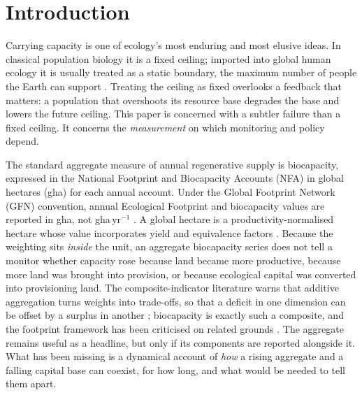 \documentclass[preprint,12pt,authoryear]{elsarticle}
\begin{document}
\section{Introduction}\label{sec:intro}

Carrying capacity is one of ecology's most enduring and most elusive ideas. In classical population biology it is a fixed ceiling; imported into global human ecology it is usually treated as a static boundary, the maximum number of people the Earth can support \citep[cf.][]{Cohen1995}. Treating the ceiling as fixed overlooks a feedback that matters: a population that overshoots its resource base degrades the base and lowers the future ceiling. This paper is concerned with a subtler failure than a fixed ceiling. It concerns the \emph{measurement} on which monitoring and policy depend.

The standard aggregate measure of annual regenerative supply is biocapacity, expressed in the National Footprint and Biocapacity Accounts (NFA) in global hectares (gha) for each annual account. Under the Global Footprint Network (GFN) convention, annual Ecological Footprint and biocapacity values are reported in gha, not gha\,yr$^{-1}$ \citep{GFNStandards2009,GFNGuidebook2019}. A global hectare is a productivity-normalised hectare whose value incorporates yield and equivalence factors \citep{Borucke2013,Lin2018}. Because the weighting sits \emph{inside} the unit, an aggregate biocapacity series does not tell a monitor whether capacity rose because land became more productive, because more land was brought into provision, or because ecological capital was converted into provisioning land. The composite-indicator literature warns that additive aggregation turns weights into trade-offs, so that a deficit in one dimension can be offset by a surplus in another \citep{Nardo2008,Becker2017,Fischer2022}; biocapacity is exactly such a composite, and the footprint framework has been criticised on related grounds \citep{Blomqvist2013,GiampietroSaltelli2014,vdBerghGrazi2015,Galli2016}. The aggregate remains useful as a headline, but only if its components are reported alongside it. What has been missing is a dynamical account of \emph{how} a rising aggregate and a falling capital base can coexist, for how long, and what would be needed to tell them apart.
\end{document}
